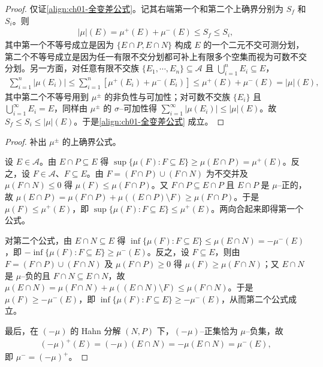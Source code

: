 \documentclass[../../main.tex]{subfiles}%
\begin{document}
\begin{proof}
仅证\eqref{align:ch01-全变差公式}。记其右端第一个和第二个上确界分别为 $S_f$ 和 $S_i$。则
\begin{align*}
|\mu|(E)=\mu^+(E)+\mu^-(E)\leqslant S_f\leqslant S_i,
\end{align*}
其中第一个不等号成立是因为 $\{E\cap P,E\cap N\}$ 构成 $E$ 的一个二元不交可测分划，第二个不等号成立是因为任一有限不交分划都可补上有限多个空集而视为可数不交分划。另一方面，对任意有限不交族 $\{E_1,\cdots ,E_n\}\subseteq\mathcal{A}$ 且 $\bigcup_{i=1}^n E_i\subseteq E$，
\begin{align*}
\sum_{i=1}^n|\mu(E_i)|\leqslant\sum_{i=1}^n[\mu^+(E_i)+\mu^-(E_i)]
\leqslant\mu^+(E)+\mu^-(E)=|\mu|(E),
\end{align*}
其中第二个不等号用到 $\mu^\pm$ 的非负性与可加性；对可数不交族 $\{E_i\}$ 且 $\bigcup_{i=1}^\infty E_i=E$，同样由 $\mu^\pm$ 的 $\sigma$--可加性得 $\sum_{i=1}^\infty|\mu(E_i)|\leqslant|\mu|(E)$。故 $S_f\leqslant S_i\leqslant|\mu|(E)$。于是\eqref{align:ch01-全变差公式} 成立。
\end{proof}

\begin{proof}
补出 $\mu^\pm$ 的上确界公式。

设 $E\in\mathcal{A}$。由 $E\cap P\subseteq E$ 得 $\sup\{\mu(F):F\subseteq E\}\geqslant\mu(E\cap P)=\mu^+(E)$。反之，设 $F\in\mathcal{A}$、$F\subseteq E$。由 $F=(F\cap P)\cup(F\cap N)$ 为不交并及 $\mu(F\cap N)\leqslant0$ 得 $\mu(F)\leqslant\mu(F\cap P)$。又 $F\cap P\subseteq E\cap P$ 且 $E\cap P$ 是 $\mu$--正的，故 $\mu(E\cap P)=\mu(F\cap P)+\mu((E\cap P)\setminus F)\geqslant\mu(F\cap P)$。于是 $\mu(F)\leqslant\mu^+(E)$，即 $\sup\{\mu(F):F\subseteq E\}\leqslant\mu^+(E)$。两向合起来即得第一个公式。

对第二个公式，由 $E\cap N\subseteq E$ 得 $\inf\{\mu(F):F\subseteq E\}\leqslant\mu(E\cap N)=-\mu^-(E)$，即 $-\inf\{\mu(F):F\subseteq E\}\geqslant\mu^-(E)$。反之，设 $F\subseteq E$，则由 $F=(F\cap P)\cup(F\cap N)$ 及 $\mu(F\cap P)\geqslant0$ 得 $\mu(F)\geqslant\mu(F\cap N)$；又 $E\cap N$ 是 $\mu$--负的且 $F\cap N\subseteq E\cap N$，故 $\mu(E\cap N)=\mu(F\cap N)+\mu((E\cap N)\setminus F)\leqslant\mu(F\cap N)$。于是 $\mu(F)\geqslant-\mu^-(E)$，即 $\inf\{\mu(F):F\subseteq E\}\geqslant-\mu^-(E)$，从而第二个公式成立。

最后，在 $(-\mu)$ 的 Hahn 分解 $(N,P)$ 下，$(-\mu)$--正集恰为 $\mu$--负集，故
\begin{align*}
(-\mu)^+(E)=(-\mu)(E\cap N)=-\mu(E\cap N)=\mu^-(E),
\end{align*}
即 $\mu^-=(-\mu)^+$。
\end{proof}
\end{document}
